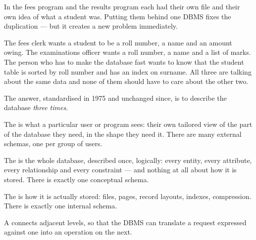 In  the fees program and the results program each had their
own file and their own idea of what a student was. Putting them behind one
DBMS fixes the duplication --- but it creates a new problem immediately.

The fees clerk wants a student to be a roll number, a name and an amount
owing. The examinations officer wants a roll number, a name and a list of
marks. The person who has to make the database fast wants to know that the
student table is sorted by roll number and has an index on surname. All three
are talking about the same data and none of them should have to care about the
other two.

The answer, standardised in 1975 and unchanged since, is to describe the
database \emph{three times}.

\begin{definitionbox}
The  is what a particular user or program sees: their own
tailored view of the part of the database they need, in the shape they need
it. There are many external schemas, one per group of users.

\smallskip
The  is the whole database, described once, logically:
every entity, every attribute, every relationship and every constraint ---
and nothing at all about how it is stored. There is exactly one conceptual
schema.

\smallskip
The  is how it is actually stored: files, pages, record
layouts, indexes, compression. There is exactly one internal schema.

\smallskip
A  connects adjacent levels, so that the DBMS can translate a
request expressed against one into an operation on the next.
\end{definitionbox}

